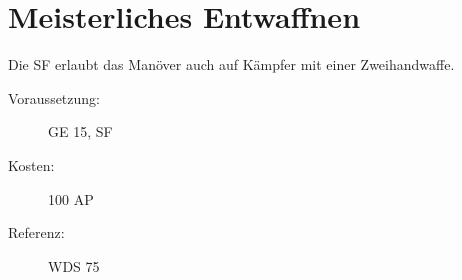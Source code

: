 \section{Meisterliches Entwaffnen}
\label{sf.meisterliches_entwaffnen}
Die SF erlaubt das Manöver  auch auf Kämpfer mit einer Zweihandwaffe.
\begin{description}
    \item[Voraussetzung:]
        GE 15, SF 
    \item [Kosten:]
        100 AP
    \item [Referenz:]
        WDS 75
\end{description}
